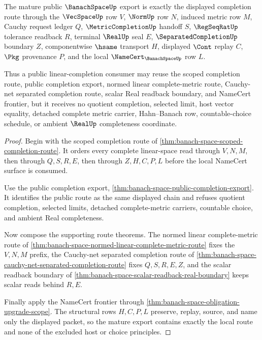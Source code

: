 \begin{theorem}
\label{thm:banach-space-mature-linear-completion-export}
The mature public $\BanachSpaceUp$ export is exactly the displayed completion route through the $\VecSpaceUp$ row $V$, $\NormUp$ row $N$, induced metric row $M$, Cauchy request ledger $Q$, $\MetricCompletionUp$ handoff $S$, $\RegSeqRatUp$ tolerance readback $R$, terminal $\RealUp$ seal $E$, $\SeparatedCompletionUp$ boundary $Z$, componentwise $\hsame$ transport $H$, displayed $\Cont$ replay $C$, $\Pkg$ provenance $P$, and the local $\NameCert_{\BanachSpaceUp}$ row $L$.

Thus a public linear-completion consumer may reuse the scoped completion route, public completion export, normed linear complete-metric route, Cauchy-net separated completion route, scalar Real readback boundary, and NameCert frontier, but it receives no quotient completion, selected limit, host vector equality, detached complete metric carrier, Hahn--Banach row, countable-choice schedule, or ambient $\RealUp$ completeness coordinate.
\end{theorem}
\begin{proof}
Begin with the scoped completion route of \autoref{thm:banach-space-scoped-completion-route}. It orders every complete linear-space read through $V,N,M$, then through $Q,S,R,E$, then through $Z,H,C,P,L$ before the local NameCert surface is consumed.

Use the public completion export, \autoref{thm:banach-space-public-completion-export}. It identifies the public route as the same displayed chain and refuses quotient completion, selected limits, detached complete-metric carriers, countable choice, and ambient Real completeness.

Now compose the supporting route theorems. The normed linear complete-metric route of \autoref{thm:banach-space-normed-linear-complete-metric-route} fixes the $V,N,M$ prefix, the Cauchy-net separated completion route of \autoref{thm:banach-space-cauchy-net-separated-completion-route} fixes $Q,S,R,E,Z$, and the scalar readback boundary of \autoref{thm:banach-space-scalar-readback-real-boundary} keeps scalar reads behind $R,E$.

Finally apply the NameCert frontier through \autoref{thm:banach-space-obligation-upgrade-scope}. The structural rows $H,C,P,L$ preserve, replay, source, and name only the displayed packet, so the mature export contains exactly the local route and none of the excluded host or choice principles.
\end{proof}

